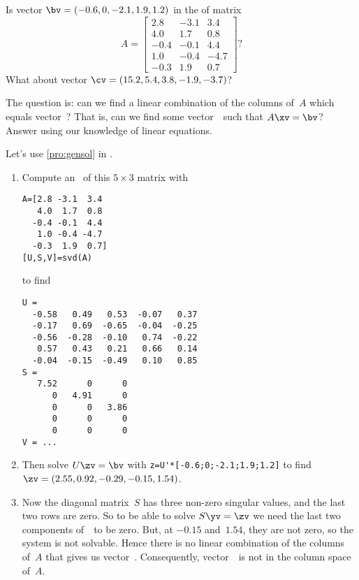 \begin{example} \label{eg:}
Is vector \(\bv=(-0.6,0,-2.1,1.9,1.2)\) in the  of matrix
\begin{equation*}
A=\begin{bmatrix} 2.8&-3.1&3.4
\\4.0&1.7&0.8
\\-0.4&-0.1&4.4
\\1.0&-0.4&-4.7
\\-0.3&1.9&0.7 \end{bmatrix}?
\end{equation*}
What about vector \(\cv=(15.2,5.4,3.8,-1.9,-3.7)\)?

\begin{solution} 
The question is: can we find a linear combination of the columns of~\(A\) which equals vector~\bv?
That is, can we find some vector~\xv\ such that \(A\xv=\bv\)?
Answer using our knowledge of linear equations.

Let's use \autoref{pro:gensol} in \script.
\begin{enumerate}
\item Compute an \svd\  of this \(5\times 3\) matrix with
\begin{verbatim}
A=[2.8 -3.1  3.4
   4.0  1.7  0.8
  -0.4 -0.1  4.4
   1.0 -0.4 -4.7
  -0.3  1.9  0.7]
[U,S,V]=svd(A)
\end{verbatim}
\setbox\ajrqrbox\hbox{}%
\marginpar{\usebox{\ajrqrbox\\[2ex]}}%
to find \twodp
\begin{verbatim}
U =
  -0.58   0.49   0.53  -0.07   0.37
  -0.17   0.69  -0.65  -0.04  -0.25
  -0.56  -0.28  -0.10   0.74  -0.22
   0.57   0.43   0.21   0.66   0.14
  -0.04  -0.15  -0.49   0.10   0.85
S =
   7.52      0      0
      0   4.91      0
      0      0   3.86
      0      0      0
      0      0      0
V = ...
\end{verbatim}

\item Then solve \(U\zv=\bv\) with \verb|z=U'*[-0.6;0;-2.1;1.9;1.2]| to find \twodp\ \(\zv=(2.55,0.92,-0.29,-0.15,1.54)\).

\item Now the diagonal matrix~\(S\) has three non-zero singular values, and the last two rows are zero.
So to be able to solve \(S\yv=\zv\) we need the last two components of~\zv\ to be zero. 
But, at \(-0.15\) and~\(1.54\), they are not zero, so the system is not solvable.
Hence there is no linear combination of the columns of~\(A\) that gives us vector~\bv.
Consequently, vector~\bv\ is not in the column space of~\(A\).


\end{enumerate}
\end{solution}
\end{example}
